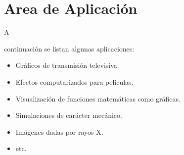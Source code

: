 \documentclass[stu, 12pt, letterpaper, donotrepeattitle, floatsintext, natbib]{apa7}
\begin{document}
    \section{Area de Aplicación}
    A \begin{justifying}
      continuación se listan algunas aplicaciones: \par
      \begin{itemize}
        \item Gráficos de transmisión televisiva.
        \item Efectos computarizados para películas.
        \item Visualización de funciones matemáticas como gráficas.
        \item Simulaciones de carácter mecánico.
        \item Imágenes dadas por rayos X.
        \item etc.
      \end{itemize}\par
    \end{justifying}
    
    \vspace{\baselineskip}
    \newpage   
    \renewcommand\refname{\textbf{Referencias}}
    
    
\end{document}
